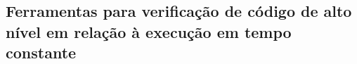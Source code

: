 \documentclass[12pt]{article}
\begin{document}
\subsection{Ferramentas para verificação de código de alto nível em relação à execução em tempo constante}












\begin{comment} %
\section{Dados Gerais}
\subsection{Objetivos do minicurso}
Curvas
O estudo de criptografia de curvas el\'ipticas (ECC) \'e muito importante nos dias atuais, já que possibilita o uso de chaves bem menores do que algoritmos como o RSA, mantendo o mesmo n\'ivel de segurança. Bibliotecas como OpenSSL, por exemplo, disponibilizam implementações de ECC para  assinatura digital (ECDSA) e troca de chaves com o esquema de Diffie-Hellman (ECDH).

Existem na literatura vários ataques de canal lateral a algoritmos de curvas el\'ipticas, o que obriga a implementa\c{c}\~ao de contramedidas de enrobustecimento, antes da entrada de tais métodos em produção. Tais ataques, em geral, visam a descoberta de chaves criptográficas, tendo como fonte de informação as diferenças de tratamento dado pelo código aos bits da chave: um desvio condicional ao valor de um bit pode levar a diferentes comportamentos que, por sua vez, produzem diferentes vazamentos de informação, seja no tempo de execução, consumo de potência, etc. 

Uma alternativa eficaz para mitigar esses problemas \'e a utiliza\c{c}\~ao de ferramentas para automatizar a inser\c{c}\~ao de contramedidas no c\'odigo. Essas ferramentas fazem a an\'alise do c\'odigo, podendo modificá-lo, ou tão somente informar onde se encontra a vulnerabilidade.

Considerando o  exposto acima, os objetivos deste minicurso s\~ao: discutir, brevemente, a necessidade e o impacto na segurança dos sistemas de IoT, do uso dos métodos criptográficos em uso atualmente em outros contextos; introduzir algoritmos de curvas el\'ipticas e suas variantes quanto às diferentes formas de implementação; introduzir e discutir protocolos de IoT baseados em ECC; discutir vários tipos de ataques de canal lateral, suas contramedidas, e limita\c{c}\~oes; descrever ferramentas para o fortalecimento de  algoritmos contra ataques de canal lateral.


\end{comment}
\end{document}

